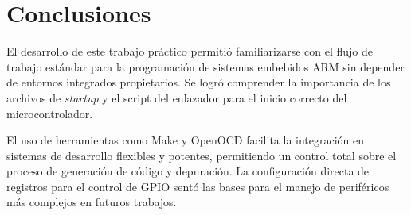 \chapter{Conclusiones}

El desarrollo de este trabajo práctico permitió familiarizarse con el flujo de trabajo 
estándar para la programación de sistemas embebidos ARM sin depender de entornos 
integrados propietarios. Se logró comprender la importancia de los archivos de 
\textit{startup} y el script del enlazador para el inicio correcto del microcontrolador.

El uso de herramientas como Make y OpenOCD facilita la integración en sistemas de 
desarrollo flexibles y potentes, permitiendo un control total sobre el proceso de 
generación de código y depuración. La configuración directa de registros para el control 
de GPIO sentó las bases para el manejo de periféricos más complejos en futuros trabajos.
